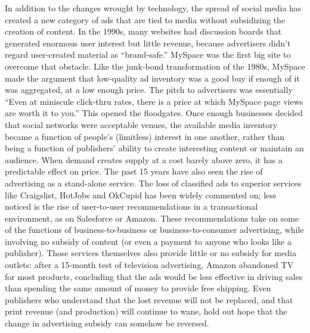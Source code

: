 In addition to the changes wrought by technology, the spread of social media
has created a new category of ads that are tied to media without subsidizing the
creation of content. In the 1990s, many websites had discussion boards that generated
enormous user interest but little revenue, because advertisers didn’t regard
user-created material as ``brand-safe.''
MySpace was the first big site to overcome that obstacle. Like the junk-bond
transformation of the 1980s, MySpace made the argument that low-quality ad
inventory was a good buy if enough of it was aggregated, at a low enough price.
The pitch to advertisers was essentially ``Even at miniscule click-thru rates, there
is a price at which MySpace page views are worth it to you.''
This opened the floodgates. Once enough businesses decided that social networks
were acceptable venues, the available media inventory became a function
of people’s (limitless) interest in one another, rather than being a function
of publishers’ ability to create interesting content or maintain an audience.
When demand creates supply at a cost barely above zero, it has a predictable
effect on price.
The past 15 years have also seen the rise of advertising as a stand-alone service.
The loss of classified ads to superior services like Craigslist, HotJobs and
OkCupid has been widely commented on; less noticed is the rise of user-to-user
recommendations in a transactional environment, as on Salesforce or Amazon.
These recommendations take on some of the functions of business-to-business
or business-to-consumer advertising, while involving no subsidy of content (or
even a payment to anyone who looks like a publisher). Those services themselves
also provide little or no subsidy for media outlets: after a 15-month test of television
advertising, Amazon abandoned TV for most products, concluding that the
ads would be less effective in driving sales than spending the same amount of
money to provide free shipping.
Even publishers who understand that the lost revenue will not be replaced, and
that print revenue (and production) will continue to wane, hold out hope that
the change in advertising subsidy can somehow be reversed.

